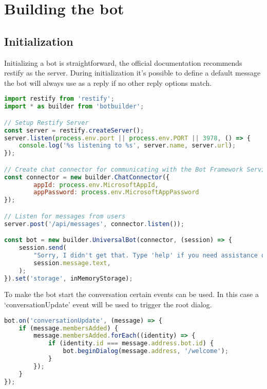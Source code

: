 \section{Building the bot}

\subsection{Initialization}

Initializing a bot is straightforward, the official documentation recommends restify\cite{restify} as the server. During initialization it's possible to define a default message the bot will always use as a reply if no other reply options match.

\begin{lstlisting}[language=JavaScript,caption=Initialization of a chatbot,label=listing:botframework-init]
import restify from 'restify';
import * as builder from 'botbuilder';

// Setup Restify Server
const server = restify.createServer();
server.listen(process.env.port || process.env.PORT || 3978, () => {
	console.log('%s listening to %s', server.name, server.url); 
});

// Create chat connector for communicating with the Bot Framework Service
const connector = new builder.ChatConnector({
		appId: process.env.MicrosoftAppId,
		appPassword: process.env.MicrosoftAppPassword
});

// Listen for messages from users 
server.post('/api/messages', connector.listen());

const bot = new builder.UniversalBot(connector, (session) => {
	session.send(
		"Sorry, I didn't get that. Type 'help' if you need assistance or try a different sentence.",
		session.message.text,
	);
}).set('storage', inMemoryStorage);
\end{lstlisting}

To make the bot start the conversation certain events can be used. In this case a `conversationUpdate' event will be used to trigger the root dialog.

\begin{lstlisting}[language=JavaScript,caption=The root event of a bot,label=listing:botframework-init-message]
bot.on('conversationUpdate', (message) => {
	if (message.membersAdded) {
		message.membersAdded.forEach((identity) => {
			if (identity.id === message.address.bot.id) {
				bot.beginDialog(message.address, '/welcome');
			}
		});
	}
});
\end{lstlisting}

